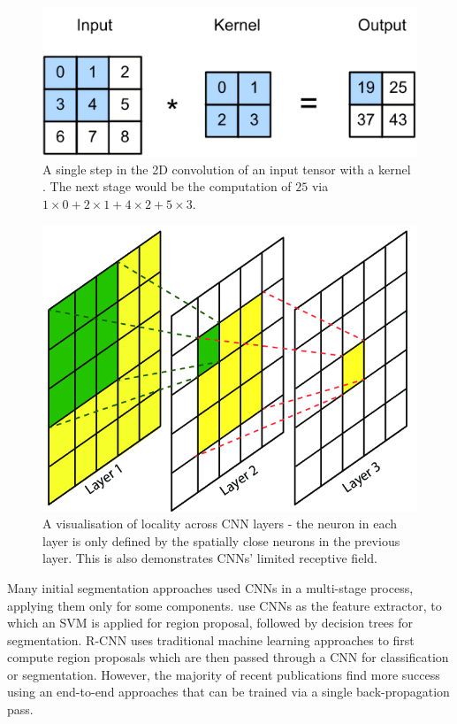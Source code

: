 \documentclass[a4paper,12pt]{report}
\begin{document}
    \begin{figure}[ht]
        \centering
        \includegraphics[scale=0.7]{res/convolution.png}
        \caption{A single step in the 2D convolution of an input tensor with a kernel \cite{zhang_dive_2019}. The next stage would be the computation of $25$ via $1 \times 0 + 2 \times 1 + 4 \times 2 + 5 \times 3$.}
        \label{fig:convolution}
    \end{figure}

    \begin{figure}
        \centering
        \includegraphics[scale=0.3]{res/receptive-field.png}
        \caption{A visualisation of locality across CNN layers \cite{lin_maritime_2017} - the neuron in each layer is only defined by the spatially close neurons in the previous layer. This is also demonstrates CNNs' limited receptive field.}
        \label{fig:receptive_field}
    \end{figure}
    
    Many initial segmentation approaches used CNNs in a multi-stage process, applying them only for some components. \cite{gupta_learning_2014} use CNNs as the feature extractor, to which an SVM is applied for region proposal, followed by decision trees for segmentation. R-CNN \cite{girshick_rich_2014} uses traditional machine learning approaches to first compute region proposals which are then passed through a CNN for classification or segmentation. However, the majority of recent publications find more success using an end-to-end approaches that can be trained via a single back-propagation pass.
    
\end{document}
